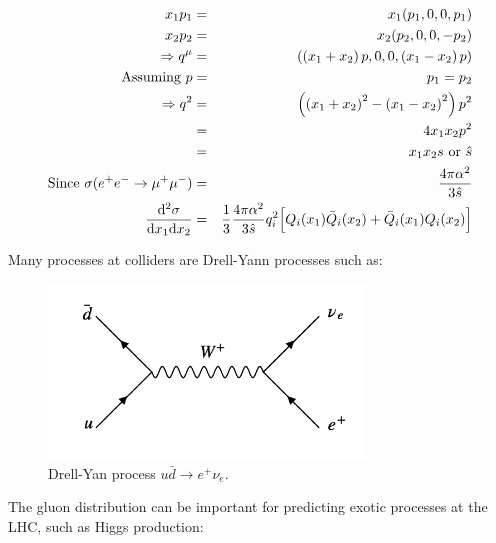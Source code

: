 \begin{eqnarray*}
  x_1p_1 & = & x_1(p_1,0,0,p_1) \\
  x_2p_2 & = & x_2(p_2,0,0,-p_2) \\
  \Rightarrow q^{\mu} & = & \left(\left(x_1 + x_2\right)p,0,0,\left(x_1 - x_2\right)p\right) \\
  \textrm{Assuming } p & = & p_1 = p_2 \\
  \Rightarrow q^2 & = & \left( \left(x_1 + x_2\right)^2 - \left(x_1 - x_2\right)^2\right)p^2 \\
  & = & 4x_1x_2p^2 \\
  & = & x_1x_2s \textrm{ or } \hat{s} \\
  \textrm{Since } \sigma(e^+e^-\to\mu^+\mu^-) & = & \frac{4\pi\alpha^2}{3\hat{s}} \\
  \frac{\mathrm{d}^2\sigma}{\mathrm{d}x_1\mathrm{d}x_2} & = & \frac{1}{3}\frac{4\pi\alpha^2}{3\hat{s}}q_i^2\Big[Q_i(x_1)\bar{Q}_i(x_2) + \bar{Q}_i(x_1)Q_i(x_2)\Big]
\end{eqnarray*}

Many processes at colliders are Drell-Yann processes such as:

\begin{figure}[!htb]
  \begin{center}
    \includegraphics[width=0.75\textwidth]{images/web_feynman/image_65.png}
    \caption[Drell-Yan process $u\bar{d}\to e^+\nu_e$]{Drell-Yan process $u\bar{d}\to e^+\nu_e$.}
    \label{fig:ch14_DrellYanUDToENu}
  \end{center}
\end{figure}

The gluon distribution can be important for predicting exotic processes at the LHC, such as Higgs production:

